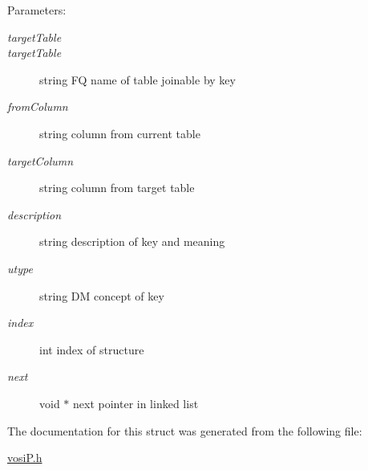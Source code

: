 \begin{Desc}
\item[Parameters:]
\begin{description}
\item[{\em targetTable}]\item[{\em targetTable}]string FQ name of table joinable by key \item[{\em fromColumn}]string column from current table \item[{\em targetColumn}]string column from target table \item[{\em description}]string description of key and meaning \item[{\em utype}]string DM concept of key \item[{\em index}]int index of structure \item[{\em next}]void $\ast$ next pointer in linked list \end{description}
\end{Desc}


The documentation for this struct was generated from the following file:\begin{CompactItemize}
\item 
\hyperlink{vosiP_8h}{vosiP.h}\end{CompactItemize}
